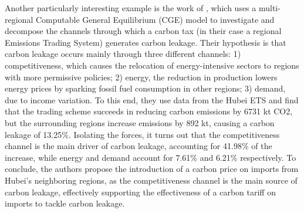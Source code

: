 Another particularly interesting example is the work of \textcite{Tan2018}, which uses a multi-regional Computable General Equilibrium (CGE) model to investigate and decompose the channels through which a carbon tax (in their case a regional Emissions Trading System) generates carbon leakage. Their hypothesis is that carbon leakage occurs mainly through three different channels: 1) competitiveness, which causes the relocation of energy-intensive sectors to regions with more permissive policies; 2) energy, the reduction in production lowers energy prices by sparking fossil fuel consumption in other regions; 3) demand, due to income variation. To this end, they use data from the Hubei ETS and find that the trading scheme succeeds in reducing carbon emissions by 6731 kt CO2, but the surrounding regions increase emissions by 892 kt, causing a carbon leakage of 13.25\%. Isolating the forces, it turns out that the competitiveness channel is the main driver of carbon leakage, accounting for 41.98\% of the increase, while energy and demand account for 7.61\% and 6.21\% respectively. To conclude, the authors propose the introduction of a carbon price on imports from Hubei's neighboring regions, as the competitiveness channel is the main source of carbon leakage, effectively supporting the effectiveness of a carbon tariff on imports to tackle carbon leakage.